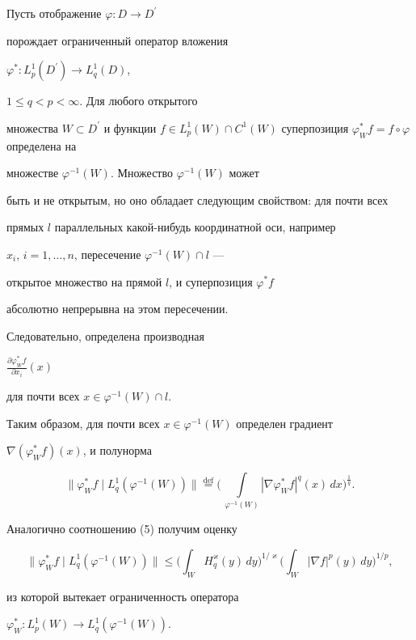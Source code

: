 Пусть отображение $\varphi :D\to D^{\prime}$


порождает ограниченный оператор вложения


$\varphi^{*} :L_{p}^{1}(D^{\prime})\to L_{q}^{1}(D)$,


$1\leq q<p<\infty$. Для любого открытого


множества $W\subset D^{\prime}$ и функции $f\in L^1_p(W)\cap


C^1(W)$ суперпозиция $\varphi_W^*f=f\circ\varphi$ определена на


множестве $\varphi^{-1}(W)$. Множество $\varphi^{-1}(W)$ может


быть и не открытым, но оно обладает следующим свойством: для почти всех


прямых $l$ параллельных какой-нибудь координатной оси, например


$x_i$, $i=1,\dotsc,n$, пересечение $\varphi^{-1}(W)\cap l$ ---


открытое множество на прямой $l$, и суперпозиция $\varphi^*f$


абсолютно непрерывна на этом пересечении.


Следовательно, определена производная


$\frac{\partial \varphi_W^*f}{\partial x_i}(x)$


для почти всех $x\in \varphi^{-1}(W)\cap l$.


Таким образом, для почти всех $x\in\varphi^{-1}(W)$ определен градиент


$\nabla (\varphi_W^*f)(x)$, и полунорма


$$


\|\varphi_W^*f\mid L^1_q(\varphi^{-1}(W))\|\overset{\mathrm{def}}{=}{}


\bigg(\,\int\limits_{\varphi^{-1}(W)}|\nabla


\varphi_W^*f|^q(x)\,dx\bigg)^{\frac{1}{q}}.


$$


Аналогично соотношению (5) получим оценку


$$


\|\varphi_W^*f\mid L_q^1(\varphi^{-1}(W))\|\le


\bigg(\int_{W}H^{\varkappa}_q(y)\,dy\bigg)^{1/\varkappa}


\bigg(\int_{W}|\nabla f|^p(y) \,dy\bigg)^{1/p},


$$


из которой вытекает ограниченность оператора


$\varphi_W^*:L^1_p(W)\to L^1_q(\varphi^{-1}(W))$.





